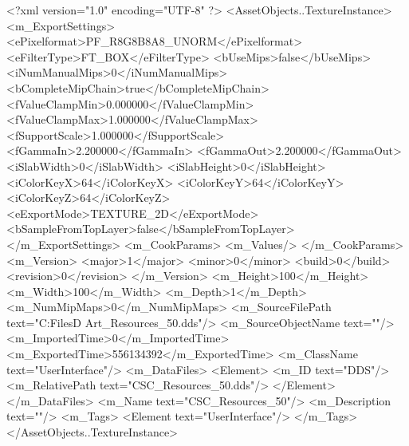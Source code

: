 <?xml version="1.0" encoding="UTF-8" ?>
<AssetObjects..TextureInstance>
	<m_ExportSettings>
		<ePixelformat>PF_R8G8B8A8_UNORM</ePixelformat>
		<eFilterType>FT_BOX</eFilterType>
		<bUseMips>false</bUseMips>
		<iNumManualMips>0</iNumManualMips>
		<bCompleteMipChain>true</bCompleteMipChain>
		<fValueClampMin>0.000000</fValueClampMin>
		<fValueClampMax>1.000000</fValueClampMax>
		<fSupportScale>1.000000</fSupportScale>
		<fGammaIn>2.200000</fGammaIn>
		<fGammaOut>2.200000</fGammaOut>
		<iSlabWidth>0</iSlabWidth>
		<iSlabHeight>0</iSlabHeight>
		<iColorKeyX>64</iColorKeyX>
		<iColorKeyY>64</iColorKeyY>
		<iColorKeyZ>64</iColorKeyZ>
		<eExportMode>TEXTURE_2D</eExportMode>
		<bSampleFromTopLayer>false</bSampleFromTopLayer>
	</m_ExportSettings>
	<m_CookParams>
		<m_Values/>
	</m_CookParams>
	<m_Version>
		<major>1</major>
		<minor>0</minor>
		<build>0</build>
		<revision>0</revision>
	</m_Version>
	<m_Height>100</m_Height>
	<m_Width>100</m_Width>
	<m_Depth>1</m_Depth>
	<m_NumMipMaps>0</m_NumMipMaps>
	<m_SourceFilePath text="C:\Users\Shadow\Desktop\Working Files\2D Art\Resources\CSC_Resources_50.dds"/>
	<m_SourceObjectName text=""/>
	<m_ImportedTime>0</m_ImportedTime>
	<m_ExportedTime>556134392</m_ExportedTime>
	<m_ClassName text="UserInterface"/>
	<m_DataFiles>
		<Element>
			<m_ID text="DDS"/>
			<m_RelativePath text="CSC_Resources_50.dds"/>
		</Element>
	</m_DataFiles>
	<m_Name text="CSC_Resources_50"/>
	<m_Description text=""/>
	<m_Tags>
		<Element text="UserInterface"/>
	</m_Tags>
</AssetObjects..TextureInstance>
